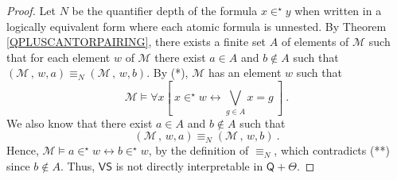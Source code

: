 \documentclass[10pt,a4paper, openany,  oldfontcommands]{memoir}
\newtheorem{open problem} [theorem] {Open Problem}
\newtheorem{open question} [theorem] {Open Question}
\begin{document}
\begin{proof}
Let  $N$ be the quantifier depth of the formula   $  x  \in^{  \star } y $ when written in a logically equivalent form  where  each atomic formula is unnested.
By Theorem \ref{QPLUSCANTORPAIRING}, 
there exists  a finite set $ A $ of elements of   $  \mathcal{M} $  such that for 
 each    element  $w $  of   $  \mathcal{M} $  there exist 
 $  a  \in  A  $  and  $  b \not\in A  $ such that 
$  \left( \mathcal{M}   \, , \,  w  ,    a    \right)  \equiv_N    \left( \mathcal{M}   \, , \,  w  ,    b   \right)    $. 
By (*),   $   \mathcal{M}  $ has an element  $   w $  such that 
\[
\mathcal{M}     \models     \forall  x   \left[   \   
x   \in^{  \star }   w   \leftrightarrow  \bigvee_{  g \in  A }  x =  g
 \      \right]      
\         .
\tag{**}
\]
We also know that there exist  $   a   \in  A  $  and   $    b    \not\in  A  $   such that 
\[
  \left( \mathcal{M}   \, , \,   w   ,  a     \right)  \equiv_N    \left( \mathcal{M}   \, , \, w   ,   b    \right)    
  \       .
  \]
Hence, 
$   \mathcal{M}    \models   a   \in^{  \star }   w   \leftrightarrow    b \in^{  \star }   w    $,  by the definition of  $  \equiv_N    $,  
which contradicts (**)  since   $  b  \not\in  A  $. 
Thus,  $  \mathsf{VS} $ is not directly interpretable in  $\mathsf{Q} +  \Theta   $. 
\end{proof}
\end{document}
